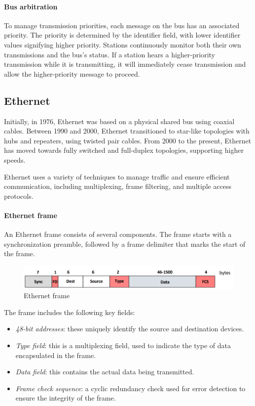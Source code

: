 \paragraph*{Bus arbitration}
To manage transmission priorities, each message on the bus has an associated priority. 
The priority is determined by the identifier field, with lower identifier values signifying higher priority. 
Stations continuously monitor both their own transmissions and the bus's status. 
If a station hears a higher-priority transmission while it is transmitting, it will immediately cease transmission and allow the higher-priority message to proceed.

\subsection{Ethernet}
Initially, in 1976, Ethernet was based on a physical shared bus using coaxial cables.
Between 1990 and 2000, Ethernet transitioned to star-like topologies with hubs and repeaters, using twisted pair cables.
From 2000 to the present, Ethernet has moved towards fully switched and full-duplex topologies, supporting higher speeds.

Ethernet uses a variety of techniques to manage traffic and ensure efficient communication, including multiplexing, frame filtering, and multiple access protocols.

\paragraph*{Ethernet frame}
An Ethernet frame consists of several components. 
The frame starts with a synchronization preamble, followed by a frame delimiter that marks the start of the frame.
\begin{figure}[H]
    \centering
    \includegraphics[width=0.5\linewidth]{images/eth.png}
    \caption{Ethernet frame}
\end{figure}
The frame includes the following key fields:
\begin{itemize}
    \item \textit{48-bit addresses}: these uniquely identify the source and destination devices.
    \item \textit{Type field}: this is a multiplexing field, used to indicate the type of data encapsulated in the frame.
    \item \textit{Data field}: this contains the actual data being transmitted.
    \item \textit{Frame check sequence}: a cyclic redundancy check used for error detection to ensure the integrity of the frame.
\end{itemize}

